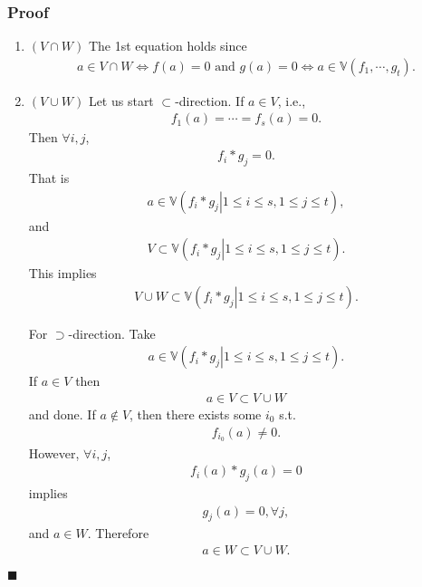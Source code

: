 \documentclass[11pt]{book}
\begin{document}
\subsubsection{Proof}
\begin{enumerate}

\item $(V \cap W)$
The 1st equation holds since
\begin{eqnarray}
a \in V \cap W \Leftrightarrow f(a) = 0 \text{ and } g(a) = 0 \Leftrightarrow a \in \mathbb{V}(f_1, \cdots, g_t).
\end{eqnarray}

\item $(V \cup W)$
Let us start $\subset$-direction.
If $a \in V$, i.e.,
\begin{eqnarray}
f_1(a) = \cdots = f_s(a) = 0.
\end{eqnarray}
Then $\forall i,j$,
\begin{eqnarray}
f_i * g_j = 0.
\end{eqnarray}
That is 
\begin{eqnarray}
a \in \mathbb{V}\left( \left. f_i * g_j \right| 1 \leq i \leq s, 1 \leq j \leq t \right),
\end{eqnarray}
and
\begin{eqnarray}
V \subset \mathbb{V}\left( \left. f_i * g_j \right| 1 \leq i \leq s, 1 \leq j \leq t \right).
\end{eqnarray}
This implies
\begin{eqnarray}
V \cup W \subset \mathbb{V}\left( \left. f_i * g_j \right| 1 \leq i \leq s, 1 \leq j \leq t \right).
\end{eqnarray}

For $\supset$-direction.
Take
\begin{eqnarray}
a \in \mathbb{V}\left( \left. f_i * g_j \right| 1 \leq i \leq s, 1 \leq j \leq t \right).
\end{eqnarray}
If $a \in V$ then
\begin{eqnarray}
a \in V \subset V \cup W
\end{eqnarray}
and done.
If $a \not\in V$, then there exists some $i_0$ s.t.
\begin{eqnarray}
f_{i_0}(a) \neq 0.
\end{eqnarray}
However, $\forall i,j$,
\begin{eqnarray}
f_i(a) * g_j(a) = 0
\end{eqnarray}
implies
\begin{eqnarray}
g_j(a) = 0, \forall j,
\end{eqnarray}
and $a \in W$.
Therefore
\begin{eqnarray}
a \in W \subset V \cup W.
\end{eqnarray}

\end{enumerate}
$\blacksquare$
\end{document}
